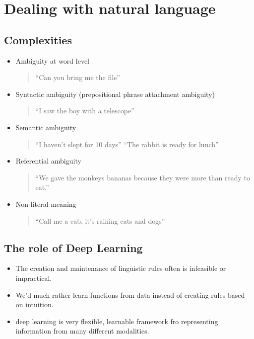 \documentclass[11pt]{article}
\begin{document}


\tableofcontents

\clearpage

\section{Dealing with natural language}

\subsection{Complexities}

\begin{itemize}
    \item Ambiguity at word level
          \begin{quote}
            ``Can you bring me the file''
        \end{quote}
    \item Syntactic ambiguity (prepositional phrase attachment ambiguity)
          \begin{quote}
            ``I saw the boy with a telescope''
        \end{quote}
    \item Semantic ambiguity
          \begin{quote}
            ``I haven't slept for 10 days''
            ``The rabbit is ready for lunch''
        \end{quote}
    \item Referential ambiguity
          \begin{quote}
            ``We gave the monkeys bananas because they were more than ready to eat.''
        \end{quote}
    \item Non-literal meaning
          \begin{quote}
            ``Call me a cab, it's raining cats and dogs''
        \end{quote}
\end{itemize}

\subsection{The role of Deep Learning}

\begin{itemize}
    \item The creation and maintenance of linguistic rules often is infeasible or impractical.
    \item We'd much rather learn functions from data instead of creating rules based on intuition.
    \item deep learning is very flexible, learnable framework fro representing information from many different modalities.
\end{itemize}
\end{document}
